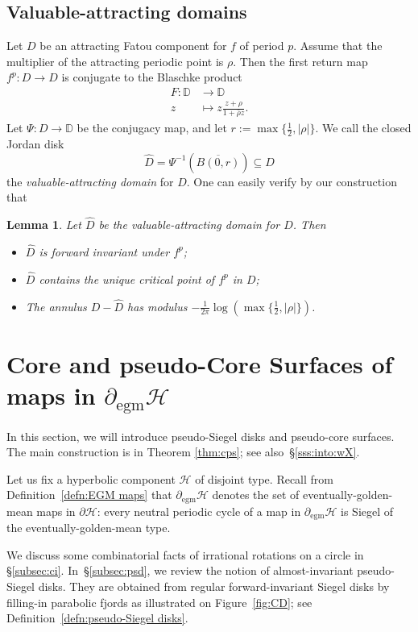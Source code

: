 \documentclass[11pt, reqno]{amsart}
\numberwithin{equation}{section}
\theoremstyle{plain}
\theoremstyle{theorem}
\newtheorem{lem}[theorem]{Lemma}
\theoremstyle{plain}
\theoremstyle{definition}
\newcommand{\D}{\mathbb{D}}
\numberwithin{figure}{section}
\newcommand{\egm}{{\operatorname{egm}}}
\begin{document}
\subsection{Valuable-attracting domains}\label{subsec:vad}
\label{sss:ValDomain}
Let $D$ be an attracting Fatou component for $f$ of period $p$.
Assume that the multiplier of the attracting periodic point is $\rho$.
Then the first return map $f^{p}: D \longrightarrow D$ is conjugate to the Blaschke product
\begin{align*}
F: \D &\longrightarrow \D\\
z &\mapsto z \frac{z+\rho}{1+\bar\rho z}.
\end{align*}
Let $\Psi: D \longrightarrow \D$ be the conjugacy map, and let $r:= \max\{\frac{1}{2}, \vert \rho\vert\}$.
We call the closed Jordan disk
$$
\widehat D = \Psi^{-1}(\overline{B(0, r)}) \subseteq D
$$
the {\em valuable-attracting domain} for $D$.
One can easily verify by our construction that
\begin{lem}\label{lem:kad}
Let $\widehat D$ be the valuable-attracting domain for $D$. Then
\begin{itemize}
\item $\widehat D$ is forward invariant under $f^{p}$;
\item $\widehat D$ contains the unique critical point of $f^{p}$ in $D$;
\item The annulus $D - \widehat D$ has modulus $-\frac{1}{2\pi} \log (\max\{\frac{1}{2}, \vert \rho\vert\})$.
\end{itemize}
\end{lem}


\section{Core and pseudo-Core Surfaces of maps in $\partial_\egm \mathcal H $}
\label{sec:psd} In this section, we will introduce pseudo-Siegel disks and pseudo-core surfaces. The main construction is in Theorem \ref{thm:cps}; see also~\S\ref{sss:into:wX}.


Let us fix a hyperbolic component $\mathcal{H}$ of disjoint type. Recall from Definition~\ref{defn:EGM maps} that $\partial_\egm \mathcal H$ denotes the set of eventually-golden-mean maps in $\partial \mathcal H$: every neutral periodic cycle of a map in $\partial_\egm \mathcal H$ is Siegel of the eventually-golden-mean type. 

We discuss some combinatorial facts of irrational rotations on a circle in \S \ref{subsec:ci}. In~\S\ref{subsec:psd}, we review the notion of almost-invariant pseudo-Siegel disks. They are obtained from regular forward-invariant Siegel disks by filling-in parabolic fjords as illustrated on Figure~\ref{fig:CD}; see Definition~\ref{defn:pseudo-Siegel disks}.
\end{document}
